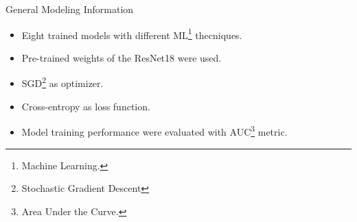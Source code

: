 \documentclass[dvipsnames,mathserif]{beamer}
\begin{document}
{    \begin{frame}

      \large General Modeling Information
      \vspace{0.25cm}

      \footnotesize

      \begin{itemize}
        \item Eight trained models with different ML\footnote{Machine Learning.} thecniques.
        \item Pre-trained weights of the ResNet18 were used.
        \item SGD\footnote{Stochastic Gradient Descent} as optimizer.
        \item Cross-entropy as loss function.
        \item Model training performance were evaluated with AUC\footnote{Area Under the Curve.} metric.
      \end{itemize}

    \end{frame}

    \begin{frame}


      \begin{table}


\end{table}
\end{frame}}
\end{document}
